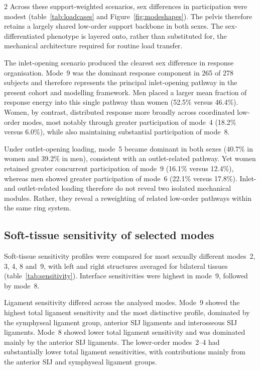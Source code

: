\documentclass[openacc]{rsproca_new}
\begin{document}
\begin{multicols}{2}
Across these support-weighted scenarios, sex differences in participation were modest (table~\ref{tab:loadcases} and Figure~\ref{fig:modeshapes}). The pelvis therefore retains a largely shared low-order support backbone in both sexes. The sex-differentiated phenotype is layered onto, rather than substituted for, the mechanical architecture required for routine load transfer.

The inlet-opening scenario produced the clearest sex difference in response organisation. Mode~9 was the dominant response component in 265 of 278 subjects and therefore represents the principal inlet-opening pathway in the present cohort and modelling framework. Men placed a larger mean fraction of response energy into this single pathway than women (52.5\% versus 46.4\%). Women, by contrast, distributed response more broadly across coordinated low-order modes, most notably through greater participation of mode~4 (18.2\% versus 6.0\%), while also maintaining substantial participation of mode~8.

Under outlet-opening loading, mode~5 became dominant in both sexes (40.7\% in women and 39.2\% in men), consistent with an outlet-related pathway. Yet women retained greater concurrent participation of mode~9 (16.1\% versus 12.4\%), whereas men showed greater participation of mode~6 (22.1\% versus 17.8\%). Inlet- and outlet-related loading therefore do not reveal two isolated mechanical modules. Rather, they reveal a reweighting of related low-order pathways within the same ring system.

\subsection{Soft-tissue sensitivity of selected modes}

Soft-tissue sensitivity profiles were compared for most sexually different modes~2, 3, 4, 8 and~9, with left and right structures averaged for bilateral tissues (table~\ref{tab:sensitivity}). Interface sensitivities were highest in mode~9, followed by mode~8.

Ligament sensitivity differed across the analysed modes. Mode~9 showed the highest total ligament sensitivity and the most distinctive profile, dominated by the symphyseal ligament group, anterior SIJ ligaments and interosseous SIJ ligaments. Mode~8 showed lower total ligament sensitivity and was dominated mainly by the anterior SIJ ligaments. The lower-order modes~2--4 had substantially lower total ligament sensitivities, with contributions mainly from the anterior SIJ and symphyseal ligament groups.


\end{multicols}
\end{document}
